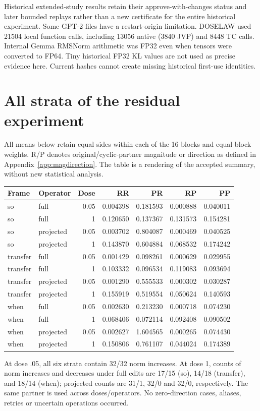 Historical extended-study results retain their approve-with-changes status and later bounded replays rather than a new certificate for the entire historical experiment. Some GPT-2 files have a restart-origin limitation. DOSELAW used 21504 local function calls, including 13056 native (3840 JVP) and 8448 TC calls. Internal Gemma RMSNorm arithmetic was FP32 even when tensors were converted to FP64. Tiny historical FP32 KL values are not used as precise evidence here. Current hashes cannot create missing historical first-use identities.
\section{All strata of the residual experiment}\label{app:mechanism}
All means below retain equal sides within each of the 16 blocks and equal block weights. R/P denotes original/cyclic-partner magnitude or direction as defined in Appendix~\ref{app:magdirection}. The table is a rendering of the accepted summary, without new statistical analysis.
\begin{center}\small
\begin{tabular}{llrrrrr}\toprule Frame & Operator & Dose & RR & PR & RP & PP\\\midrule
so & full & 0.05 & 0.004398 & 0.181593 & 0.000888 & 0.040011\\
so & full & 1 & 0.120650 & 0.137367 & 0.131573 & 0.154281\\
so & projected & 0.05 & 0.003702 & 0.804087 & 0.000469 & 0.040525\\
so & projected & 1 & 0.143870 & 0.604884 & 0.068532 & 0.174242\\
transfer & full & 0.05 & 0.001429 & 0.098261 & 0.000629 & 0.029955\\
transfer & full & 1 & 0.103332 & 0.096534 & 0.119083 & 0.093694\\
transfer & projected & 0.05 & 0.001290 & 0.555533 & 0.000302 & 0.030287\\
transfer & projected & 1 & 0.155919 & 0.519554 & 0.050624 & 0.140593\\
when & full & 0.05 & 0.002630 & 0.213230 & 0.000718 & 0.074230\\
when & full & 1 & 0.068406 & 0.072114 & 0.092408 & 0.090502\\
when & projected & 0.05 & 0.002627 & 1.604565 & 0.000265 & 0.074430\\
when & projected & 1 & 0.150806 & 0.761107 & 0.044024 & 0.174389\\
\bottomrule\end{tabular}\end{center}
At dose .05, all six strata contain 32/32 norm increases. At dose 1, counts of norm increases and decreases under full edits are 17/15 (so), 14/18 (transfer), and 18/14 (when); projected counts are 31/1, 32/0 and 32/0, respectively. The same partner is used across doses/operators. No zero-direction cases, aliases, retries or uncertain operations occurred.

